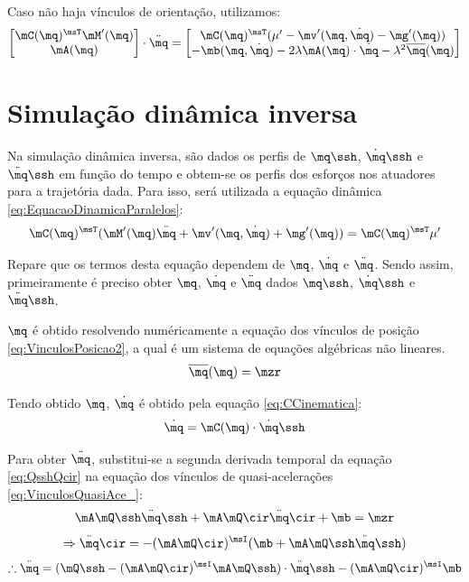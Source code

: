 \documentclass[]{politex}
\begin{document}
Caso não haja vínculos de orientação, utilizamos:
\begin{equation}
\begin{bmatrix}
\mC(\mq)^\msT \mM'(\mq) \\
\mA(\mq)
\end{bmatrix}
\cdot
\ddot{\mq}
=
\begin{bmatrix}
\mC(\mq)^\msT (\mu' - \mv'(\mq,\dot{\mq}) - \mg'(\mq) ) \\
-\mb(\mq,\dot{\mq}) -
2\lambda
\mA(\mq) \cdot \dot{\mq} -
\lambda^2
\overline{\mq}(\mq) \\
\end{bmatrix}
\end{equation}

\section{Simulação dinâmica inversa} 

Na simulação dinâmica inversa, são dados os perfis de $\mq\ssh$, $\dot{\mq}\ssh$ e $\ddot{\mq}\ssh$ em função do tempo e obtem-se os perfis dos esforços nos atuadores para a trajetória dada. Para isso, será utilizada a equação dinâmica \eqref{eq:EquacaoDinamicaParalelos}:
$$ \mC(\mq)^\msT (   \mM'(\mq)\ddot{\mq} + \mv'(\mq,\dot{\mq}) + \mg'(\mq) ) = \mC(\mq)^\msT \mu' $$

Repare que os termos desta equação dependem de $\mq$, $\dot{\mq}$ e $\ddot{\mq}$. Sendo assim, primeiramente é preciso obter $\mq$, $\dot{\mq}$ e $\ddot{\mq}$ dados $\mq\ssh$, $\dot{\mq}\ssh$ e $\ddot{\mq}\ssh$.

$\mq$ é obtido resolvendo numéricamente a equação dos vínculos de posição \eqref{eq:VinculosPosicao2}, a qual é um sistema de equações algébricas não lineares.
$$ \overline{\mq}(\mq) = \mzr $$

Tendo obtido $\mq$, $\dot{\mq}$ é obtido pela equação \eqref{eq:CCinematica}:
$$ \dot{\mq} = \mC(\mq) \cdot \dot{\mq}\ssh $$

Para obter $\ddot{\mq}$, substitui-se a segunda derivada temporal da equação \eqref{eq:QsshQcir} na equação dos vínculos de quasi-acelerações \eqref{eq:VinculosQuasiAce_}:
$$ \mA \mQ\ssh \ddot{\mq}\ssh + \mA \mQ\cir \ddot{\mq}\cir + \mb = \mzr $$
$$ \Rightarrow  \ddot{\mq}\cir = - (\mA \mQ\cir)^\msI (\mb + \mA \mQ\ssh \ddot{\mq}\ssh) $$
\begin{equation} \label{eq:d2q_em_funcao}
\therefore \ddot{\mq} =
(\mQ\ssh - (\mA \mQ\cir)^\msI  \mA \mQ\ssh) \cdot \ddot{\mq}\ssh - (\mA \mQ\cir)^\msI \mb
\end{equation}
\end{document}
